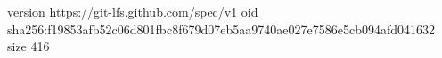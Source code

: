 version https://git-lfs.github.com/spec/v1
oid sha256:f19853afb52c06d801fbc8f679d07eb5aa9740ae027e7586e5cb094afd041632
size 416
